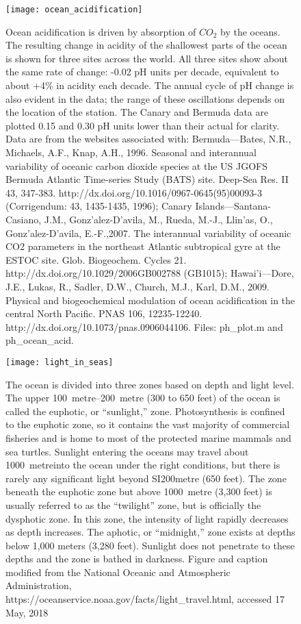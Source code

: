 {\newpage
\begin{figure}[p]
\centering
  \texttt{[image: ocean\_acidification]}%
\caption{Ocean acidification is driven by absorption of $CO_2$ by the oceans. The resulting change in acidity of the shallowest parts of the ocean is shown for three sites across the world. All three sites show about the same rate of change: -0.02 pH units per decade, equivalent to about +4\% in acidity each decade. The annual cycle of pH change is also evident in the data; the range of these oscillations depends on the location of the station. The Canary and Bermuda data are plotted 0.15 and 0.30 pH units lower than their actual for clarity. Data are from the websites associated with: Bermuda---Bates, N.R., Michaels, A.F., Knap, A.H., 1996. Seasonal and interannual variability of oceanic carbon dioxide species at the US JGOFS Bermuda Atlantic Time-series Study (BATS) site. Deep-Sea Res. II 43, 347-383. http://dx.doi.org/10.1016/0967-0645(95)00093-3 (Corrigendum: 43, 1435-1435, 1996); Canary Islands---Santana-Casiano, J.M., Gonz'alez-D'avila, M., Rueda, M.-J., Llin'as, O., Gonz'alez-D'avila, E.-F.,2007. The interannual variability of oceanic CO2 parameters in the northeast Atlantic subtropical gyre at the ESTOC site. Glob. Biogeochem. Cycles 21. http://dx.doi.org/10.1029/2006GB002788 (GB1015); Hawai'i---Dore, J.E., Lukas, R., Sadler, D.W., Church, M.J., Karl, D.M., 2009. Physical and biogeochemical modulation of ocean acidification in the central North Pacific. PNAS 106, 12235-12240. http://dx.doi.org/10.1073/pnas.0906044106. Files: ph\_plot.m and ph\_ocean\_acid.
}
\label{fig:oa}
\end{figure}

\newpage
\begin{figure}[p]
\centering
  \texttt{[image: light\_in\_seas]}%
\caption{The ocean is divided into three zones based on depth and light level. The upper \SIrange{100}{200}{metre} (300 to 650 feet) of the ocean is called the euphotic, or ``sunlight,'' zone. Photosynthesis is confined to the euphotic zone, so it contains the vast majority of commercial fisheries and is home to most of the protected marine mammals and sea turtles. Sunlight entering the oceans may travel about \SI{1000}{metre}into the ocean under the right conditions, but there is rarely any significant light beyond SI{200}{metre} (650 feet). The zone beneath the euphotic zone but above \SI{1000}{metre} (3,300 feet) is usually referred to as the ``twilight'' zone, but is officially the dysphotic zone. In this zone, the intensity of light rapidly decreases as depth increases. The aphotic, or ``midnight,'' zone exists at depths below 1,000 meters (3,280 feet). Sunlight does not penetrate to these depths and the zone is bathed in darkness. Figure and caption modified from the National Oceanic and Atmospheric Administration, https://oceanservice.noaa.gov/facts/light\_travel.html, accessed 17 May, 2018}
\label{fig:light_in_seas}
\end{figure}

}
